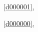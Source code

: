 ﻿



\noindent\treeindexnumbernameone\ \ref{d000001},\ \pageref{d000001}%

\noindent\treeindexnumbernameone\ \ref{d000000},\ \pageref{d000000}%









